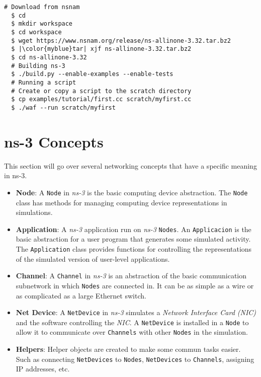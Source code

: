 \begin{lstlisting}[language=myshell,caption={Download and installation of ns-3}, captionpos=b]
  # Download from nsnam
  $ cd
  $ mkdir workspace
  $ cd workspace
  $ wget https://www.nsnam.org/release/ns-allinone-3.32.tar.bz2
  $ |\color{myblue}tar| xjf ns-allinone-3.32.tar.bz2
  $ cd ns-allinone-3.32
  # Building ns-3
  $ ./build.py --enable-examples --enable-tests
  # Running a script
  # Create or copy a script to the scratch directory
  $ cp examples/tutorial/first.cc scratch/myfirst.cc
  $ ./waf --run scratch/myfirst
\end{lstlisting}

\section{ns-3 Concepts}
\label{sec:ns3conc}
This section will go over several networking concepts that have a specific meaning in ns-3.

\begin{itemize}[topsep=0pt]
  \item[] \textbf{Node}: A \texttt{Node} in \textit{ns-3} is the basic computing device abstraction. 
  The \texttt{Node} class has methods for managing computing device representations in simulations.
  \item[] \textbf{Application}: A \textit{ns-3} application run on \textit{ns-3} \texttt{Nodes}. An 
  \texttt{Applicacion} is the basic abstraction for a user program that generates some simulated activity.  
  The \texttt{Application} class provides functions for controlling the representations of the simulated
  version of user-level applications.
  \item[] \textbf{Channel}: A \texttt{Channel} in \textit{ns-3} is an abstraction of the basic communication 
  subnetwork in which \texttt{Nodes} are connected in. It can be as simple as a wire or as complicated as a
  large Ethernet switch.
  \item[] \textbf{Net Device}: A \texttt{NetDevice} in \textit{ns-3} simulates a \textit{Network Interface Card (NIC)}
  and the software controlling the \textit{NIC}. A \texttt{NetDevice} is installed in a \texttt{Node} to allow 
  it to communicate over \texttt{Channels} with other \texttt{Nodes} in the simulation.
  \item[] \textbf{Helpers}: Helper objects are created to make some commun tasks easier. Such as connecting
  \texttt{NetDevices} to \texttt{Nodes}, \texttt{NetDevices} to \texttt{Channels}, assigning IP addresses, etc. 
\end{itemize}

